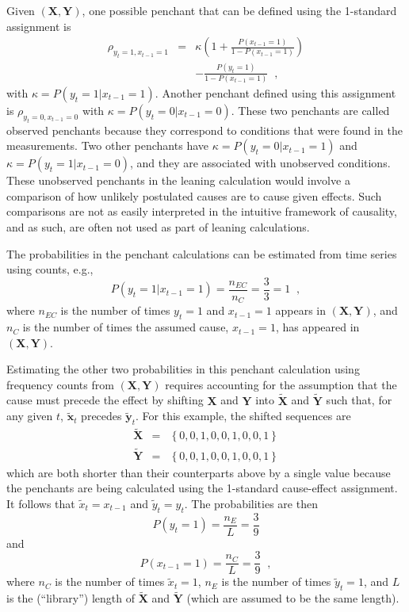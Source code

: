\documentclass{article}[10pt]
\begin{document}
Given $(\mathbf{X},\mathbf{Y})$, one possible penchant that can be defined using the 1-standard assignment is
\begin{eqnarray*}
\rho_{y_{t}=1,x_{t-1}=1} &=& \kappa \left(1+\frac{P\left(x_{t-1} = 1\right)}{1-P\left(x_{t-1} = 1\right)}\right)\\
& & -\frac{P\left(y_{t} = 1\right)}{1-P\left(x_{t-1} = 1\right)}\;\;,
\end{eqnarray*}
with $\kappa = P\left( y_t = 1 | x_{t-1} = 1\right)$.  Another penchant defined using this assignment is $\rho_{y_t=0,x_{t-1}=0}$ with  $\kappa = P\left( y_t = 0 | x_{t-1} = 0\right)$.  These two penchants are called observed penchants because they correspond to conditions that were found in the measurements.  Two other penchants have $\kappa = P\left( y_t = 0 | x_{t-1} = 1\right)$ and $\kappa = P\left( y_t = 1 | x_{t-1} = 0\right)$, and they are associated with unobserved conditions.  These unobserved penchants in the leaning calculation would involve a comparison of how unlikely postulated causes are to cause given effects.  Such comparisons are not as easily interpreted in the intuitive framework of causality, and as such, are often not used as part of leaning calculations. 

The probabilities in the penchant calculations can be estimated from time series using counts, e.g.,\
$$
P\left( y_t = 1 | x_{t-1} = 1\right) = \frac{n_{EC}}{n_C} = \frac{3}{3} = 1\;\;,
$$
where $n_{EC}$ is the number of times $y_t=1$ and $x_{t-1}=1$ appears in $(\mathbf{X},\mathbf{Y})$, and $n_{C}$ is the number of times the assumed cause, $x_{t-1}=1$, has appeared in $(\mathbf{X},\mathbf{Y})$.  

Estimating the other two probabilities in this penchant calculation using frequency counts from $(\mathbf{X},\mathbf{Y})$ requires accounting for the assumption that the cause must precede the effect by shifting $\mathbf{X}$ and $\mathbf{Y}$ into $\tilde{\mathbf{X}}$ and $\tilde{\mathbf{Y}}$ such that, for any given $t$, $\tilde{\mathbf{x}}_t$ precedes $\tilde{\mathbf{y}}_t$.  For this example, the shifted sequences are
\begin{eqnarray*}
\tilde{\mathbf{X}} &=& \left\{0,0,1,0,0,1,0,0,1\right\}\\
\tilde{\mathbf{Y}} &=& \left\{0,0,1,0,0,1,0,0,1\right\}
\end{eqnarray*}
which are both shorter than their counterparts above by a single value because the penchants are being calculated using the 1-standard cause-effect assignment. It follows that $\tilde{x}_t = x_{t-1}$ and $\tilde{y}_t=y_t$.  The probabilities are then
\begin{equation}
P\left( y_t = 1\right) = \frac{n_E}{L} = \frac{3}{9}
\end{equation}
and
\begin{equation}
P\left( x_{t-1} = 1\right) = \frac{n_C}{L} = \frac{3}{9}\;\;,
\end{equation}
where $n_C$ is the number of times $\tilde{x}_t = 1$, $n_E$ is the number of times $\tilde{y}_t = 1$, and $L$ is the (``library'') length of $\tilde{\mathbf{X}}$ and $\tilde{\mathbf{Y}}$ (which are assumed to be the same length).  
\end{document}
